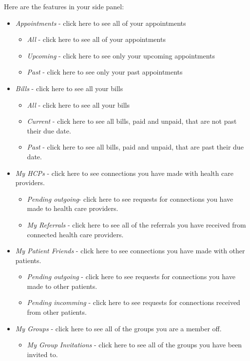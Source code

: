 Here are the features in your side panel:
\begin{itemize}
\item \textit{Appointments} - click here to see all of your appointments
\begin{itemize}
\item \textit{All} - click here to see all of your appointments
\item \textit{Upcoming} - click here to see only your upcoming appointments
\item \textit{Past} - click here to see only your past appointments
\end{itemize}
\item \textit{Bills} - click here to see all your bills
\begin{itemize} 
\item \textit{All} - click here to see all your bills
\item \textit{Current} - click here to see all bills, paid and unpaid, that are not past their due date.
\item \textit{Past}  - click here to see all bills, paid and unpaid, that are past their due date.
\end{itemize}
\item \textit{My HCPs} - click here to see connections you have made with health care providers.
\begin{itemize}
\item \textit{Pending outgoing}- click here to see requests for connections you have made to health care providers.
\item \textit{My Referrals} - click here to see all of the referrals you have received from connected health care providers.
\end{itemize}
\item \textit{My Patient Friends} - click here to see connections you have made with other patients.
\begin{itemize}
\item \textit{Pending outgoing} -  click here to see requests for connections you have made to other patients.
\item \textit{Pending incomming} - click here to see requests for connections received from other patients.
\end{itemize}
\item \textit{My Groups} - click here to see all of the groups you are a member off.
\begin{itemize}
\item \textit{My Group Invitations} - click here to see all of the groups you have been invited to.

\end{itemize}
\end{itemize}
